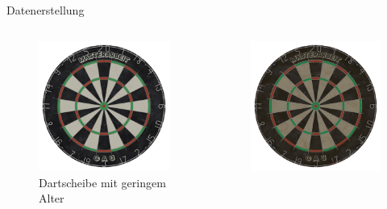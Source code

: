 \begin{frame}{Datenerstellung}
    \begin{columns}
        \begin{column}{0.33\linewidth}
            \begin{figure}
                \centering
                \includegraphics[width=\textwidth]{imgs/dartscheibe_a=0.png}
                \caption{Dartscheibe mit geringem Alter}
            \end{figure}
        \end{column}
        \begin{column}{0.33\linewidth}
            \begin{figure}
                \centering
                \includegraphics[width=\textwidth]{imgs/dartscheibe_a=1.png}

\end{figure}
\end{column}
\end{columns}
\end{frame}
